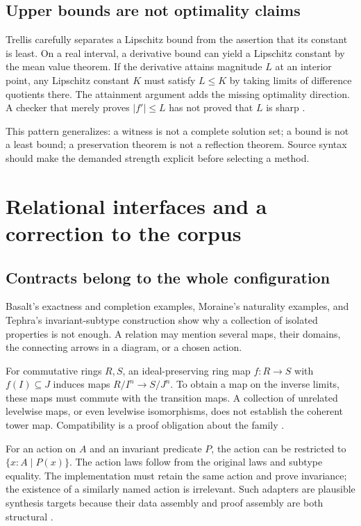 \documentclass[11pt,letterpaper]{article}
\theoremstyle{definition}\newtheorem{definition}[proposition]{Definition}
\theoremstyle{remark}\newtheorem{remark}[proposition]{Remark}
\begin{document}
\subsection{Upper bounds are not optimality claims}
Trellis carefully separates a Lipschitz bound from the assertion that its
constant is least. On a real interval, a derivative bound can yield a Lipschitz
constant by the mean value theorem. If the derivative attains magnitude $L$ at
an interior point, any Lipschitz constant $K$ must satisfy $L\le K$ by taking
limits of difference quotients there. The attainment argument adds the missing
optimality direction. A checker that merely proves $|f'|\le L$ has not proved
that $L$ is sharp \cite{trellis}.

This pattern generalizes: a witness is not a complete solution set; a bound is
not a least bound; a preservation theorem is not a reflection theorem. Source
syntax should make the demanded strength explicit before selecting a method.

\section{Relational interfaces and a correction to the corpus}\label{sec:relational}

\subsection{Contracts belong to the whole configuration}
Basalt's exactness and completion examples, Moraine's naturality examples, and
Tephra's invariant-subtype construction show why a collection of isolated
properties is not enough. A relation may mention several maps, their domains,
the connecting arrows in a diagram, or a chosen action.

For commutative rings $R,S$, an ideal-preserving ring map $f:R\to S$ with $f(I)\subseteq J$
induces maps $R/I^n\to S/J^n$. To obtain a map on the inverse limits, these
maps must commute with the transition maps. A collection of unrelated
levelwise maps, or even levelwise isomorphisms, does not establish the coherent
tower map. Compatibility is a proof obligation about the family
\cite{basalt}.

For an action on $A$ and an invariant predicate $P$, the action can be
restricted to $\{x:A\mid P(x)\}$. The action laws follow from the original
laws and subtype equality. The implementation must retain the same action
and prove invariance; the existence of a similarly named action is irrelevant.
Such adapters are plausible synthesis targets because their data assembly and
proof assembly are both structural \cite{tephra}.
\end{document}

